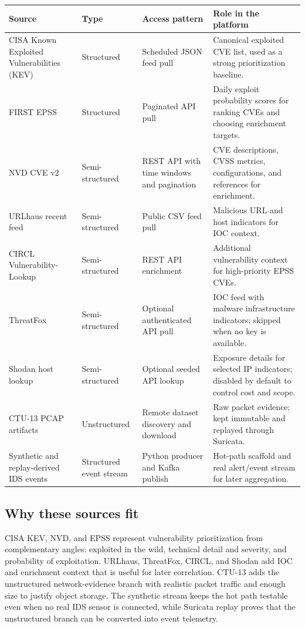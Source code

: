 \documentclass[11pt,a4paper]{article}
\begin{document}
{\small
\begin{tabularx}{\textwidth}{>{\raggedright\arraybackslash}p{3.25cm}>{\raggedright\arraybackslash}p{2.1cm}>{\raggedright\arraybackslash}p{2.5cm}X}
\toprule
\textbf{Source} & \textbf{Type} & \textbf{Access pattern} & \textbf{Role in the platform}\\
\midrule
CISA Known Exploited Vulnerabilities (KEV) & Structured & Scheduled JSON feed pull & Canonical exploited CVE list, used as a strong prioritization baseline.\\
FIRST EPSS & Structured & Paginated API pull & Daily exploit probability scores for ranking CVEs and choosing enrichment targets.\\
NVD CVE v2 & Semi-structured & REST API with time windows and pagination & CVE descriptions, CVSS metrics, configurations, and references for enrichment.\\
URLhaus recent feed & Semi-structured & Public CSV feed pull & Malicious URL and host indicators for IOC context.\\
CIRCL Vulnerability-Lookup & Semi-structured & REST API enrichment & Additional vulnerability context for high-priority EPSS CVEs.\\
ThreatFox & Semi-structured & Optional authenticated API pull & IOC feed with malware infrastructure indicators; skipped when no key is available.\\
Shodan host lookup & Semi-structured & Optional seeded API lookup & Exposure details for selected IP indicators; disabled by default to control cost and scope.\\
CTU-13 PCAP artifacts & Unstructured & Remote dataset discovery and download & Raw packet evidence; kept immutable and replayed through Suricata.\\
Synthetic and replay-derived IDS events & Structured event stream & Python producer and Kafka publish & Hot-path scaffold and real alert/event stream for later aggregation.\\
\bottomrule
\end{tabularx}
}

\subsection{Why these sources fit}
CISA KEV, NVD, and EPSS represent vulnerability prioritization from complementary angles: exploited in the wild, technical detail and severity, and probability of exploitation. URLhaus, ThreatFox, CIRCL, and Shodan add IOC and enrichment context that is useful for later correlation. CTU-13 adds the unstructured network-evidence branch with realistic packet traffic and enough size to justify object storage. The synthetic stream keeps the hot path testable even when no real IDS sensor is connected, while Suricata replay proves that the unstructured branch can be converted into event telemetry.
\end{document}
